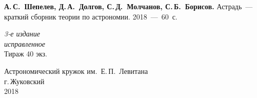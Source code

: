 \setcounter{page}{1}
\thispagestyle{empty}
\vspace*{1cm}
{\hspace{1pc} {\bfseries А.\,С.~Шепелев, Д.\,А.~Долгов, С.\,Д.~Молчанов, С.\,Б.~Борисов.} Астрадь~--- краткий сборник теории по астрономии. 2018~---~60~с.}
\vskip4cm
\begin{center}
	{\slshape 3-е издание\\
	исправленное}\\[5mm]
	\small  Тираж 40 экз.
\end{center}
\vskip6cm
\begin{center}
Астрономический кружок им.~Е.\,П.~Левитана\\[3mm]
г.\,Жуковский\\[1cm]
	2018
\end{center}
\newpage